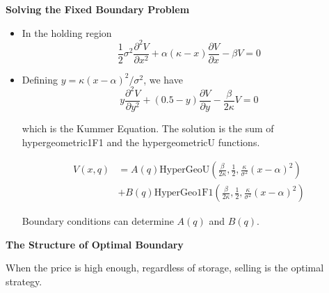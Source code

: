 \documentclass{beamer}
\begin{document}
\begin{frame}
{\bf Solving the Fixed Boundary Problem}
\begin{itemize}
  \item In the holding region
  \begin{equation*}
  \frac{1}{2} \sigma^2 \frac{\partial^2 V}{\partial x^2} + \alpha (\kappa - x) \frac{\partial V}{\partial x} - \beta V = 0
\end{equation*}

\item Defining $y = \kappa (x-\alpha)^2/\sigma^2$, we have
\begin{equation*}
  y \frac{\partial^2 V}{\partial y^2} + (0.5 - y) \frac{\partial V}{\partial y} -\frac{\beta}{2\kappa} V = 0
\end{equation*}

which is the Kummer Equation. The solution is the sum of hypergeometric1F1 and the hypergeometricU functions.

\begin{equation*}
\begin{split}
  V(x,q) &= A(q)\text{HyperGeoU}\left(\frac{\beta}{2\kappa},\frac{1}{2},\frac{\kappa}{\sigma^2}(x-\alpha)^2\right) \\
  &+ B(q)\text{HyperGeo1F1}\left(\frac{\beta}{2\kappa},\frac{1}{2},\frac{\kappa}{\sigma^2}(x-\alpha)^2\right)
  \end{split}
\end{equation*}

Boundary conditions can determine $A(q)$ and $B(q)$.

\end{itemize}

\end{frame}

\begin{frame}
{\bf The Structure of Optimal Boundary}

\begin{theorem}
When the price is high enough, regardless of storage, selling is the optimal strategy.
\end{theorem}


\end{frame}
\end{document}

